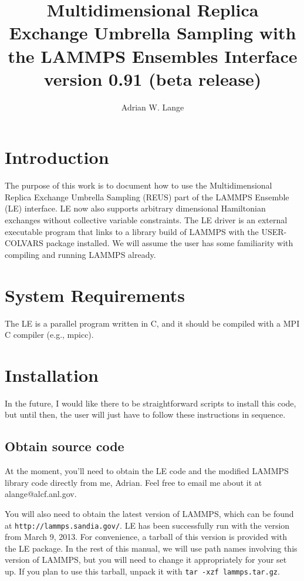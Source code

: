 \documentclass[10pt]{article}
\title{Multidimensional Replica Exchange Umbrella Sampling with the LAMMPS Ensembles Interface\\
\large version 0.91 (beta release)
}
\author{Adrian W. Lange}
\begin{document}
\maketitle

\section{Introduction}

The purpose of this work is to document how to use the Multidimensional Replica Exchange Umbrella
Sampling (REUS) part of the LAMMPS Ensemble (LE) interface. LE now also supports
arbitrary dimensional Hamiltonian exchanges without collective variable constraints. The LE driver
is an external executable program that links to a library build of LAMMPS with the 
USER-COLVARS package installed. We will assume the user has some familiarity with
compiling and running LAMMPS already. 

\section{System Requirements}

The LE is a parallel program written in C, and it should be compiled
with a MPI C compiler (e.g., mpicc). 

\section{Installation}

In the future, I would like there to be straightforward scripts to install this code,
but until then, the user will just have to follow these instructions in sequence.

\subsection{Obtain source code}

At the moment, you'll need to obtain the LE code and the modified LAMMPS
library code directly from me, Adrian. Feel free to email me about it at alange@alcf.anl.gov. 

You will also need to obtain the latest version of LAMMPS, which can be found at
\texttt{http://lammps.sandia.gov/}. LE has been successfully run with the version from
March 9, 2013. For convenience, a tarball of this version is provided with the LE package.
In the rest of this manual, we will use path names involving this version of LAMMPS, but
you will need to change it appropriately for your set up. If you plan to use this tarball,
unpack it with \texttt{tar -xzf lammps.tar.gz}.
\end{document}
